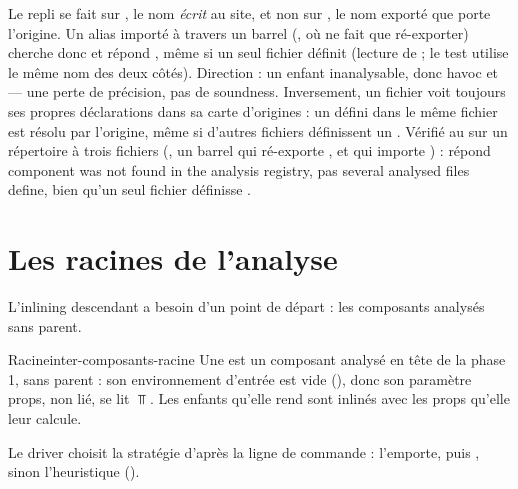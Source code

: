 \begin{piege}
Le repli se fait sur , le nom \emph{écrit} au site, et non sur , le nom
exporté que porte l'origine. Un alias importé à travers un barrel
(, où  ne fait que
ré-exporter) cherche donc  et répond , même si un seul fichier définit
 (lecture de  ; le test
 utilise le même nom des deux
côtés). Direction : un enfant inanalysable, donc havoc et \Info{} --- une perte de précision,
pas de soundness. Inversement, un fichier voit toujours ses propres déclarations dans sa carte
d'origines : un  défini dans le même fichier est résolu par l'origine, même si
d'autres fichiers définissent un . Vérifié au \snapshotCommit{} sur un répertoire à
trois fichiers (, un barrel  qui ré-exporte
, et  qui importe ) :
 répond \Info{} \og component  was not found in the
analysis registry\fg{}, pas \og several analysed files define\fg, bien qu'un seul fichier
définisse .
\end{piege}

\section{Les racines de l'analyse}
\label{sec:inter-composants-racines}

L'inlining descendant a besoin d'un point de départ : les composants analysés sans parent.

\begin{definition}{Racine}{inter-composants-racine}
Une  est un composant analysé en tête de la phase 1, sans parent : son
environnement d'entrée est vide (), donc son paramètre props, non
lié, se lit $\Top$. Les enfants qu'elle rend sont inlinés avec les props qu'elle leur calcule.
\end{definition}


Le driver choisit la stratégie d'après la ligne de commande :  l'emporte, puis
, sinon l'heuristique ().

